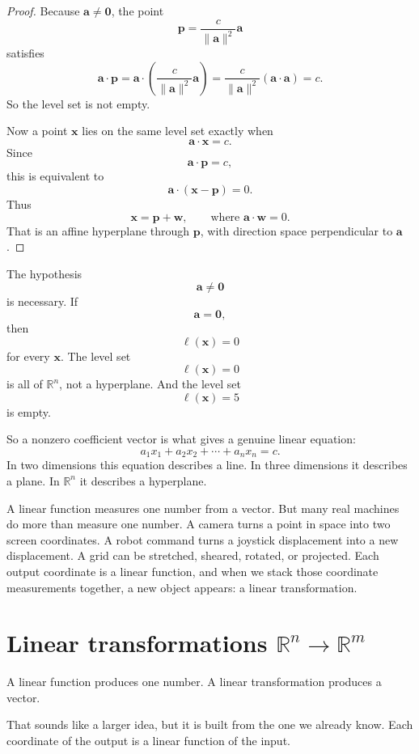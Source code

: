 \begin{proof}
Because \(\mathbf a\neq\mathbf 0\), the point
\[
    \mathbf p=\frac{c}{\|\mathbf a\|^2}\mathbf a
\]
satisfies
\[
    \mathbf a\cdot\mathbf p
    =
    \mathbf a\cdot\left(\frac{c}{\|\mathbf a\|^2}\mathbf a\right)
    =
    \frac{c}{\|\mathbf a\|^2}(\mathbf a\cdot\mathbf a)
    =
    c.
\]
So the level set is not empty.

Now a point \(\mathbf x\) lies on the same level set exactly when
\[
    \mathbf a\cdot\mathbf x=c.
\]
Since
\[
    \mathbf a\cdot\mathbf p=c,
\]
this is equivalent to
\[
    \mathbf a\cdot(\mathbf x-\mathbf p)=0.
\]
Thus
\[
    \mathbf x=\mathbf p+\mathbf w,
    \qquad
    \text{where }
    \mathbf a\cdot\mathbf w=0.
\]
That is an affine hyperplane through \(\mathbf p\), with direction space perpendicular
to \(\mathbf a\).
\end{proof}

The hypothesis
\[
    \mathbf a\neq\mathbf 0
\]
is necessary.  If
\[
    \mathbf a=\mathbf 0,
\]
then
\[
    \ell(\mathbf x)=0
\]
for every \(\mathbf x\).  The level set
\[
    \ell(\mathbf x)=0
\]
is all of \(\mathbb R^n\), not a hyperplane.  And the level set
\[
    \ell(\mathbf x)=5
\]
is empty.

So a nonzero coefficient vector is what gives a genuine linear equation:
\[
    a_1x_1+a_2x_2+\cdots+a_nx_n=c.
\]
In two dimensions this equation describes a line.  In three dimensions it describes a
plane.  In \(\mathbb R^n\) it describes a hyperplane.

A linear function measures one number from a vector.  But many real machines do more
than measure one number.  A camera turns a point in space into two screen coordinates.
A robot command turns a joystick displacement into a new displacement.  A grid can be
stretched, sheared, rotated, or projected.  Each output coordinate is a linear function,
and when we stack those coordinate measurements together, a new object appears:
a linear transformation.

\section{Linear transformations \(\mathbb R^n\to\mathbb R^m\)}

A linear function produces one number.  A linear transformation produces a vector.

That sounds like a larger idea, but it is built from the one we already know.  Each
coordinate of the output is a linear function of the input.

